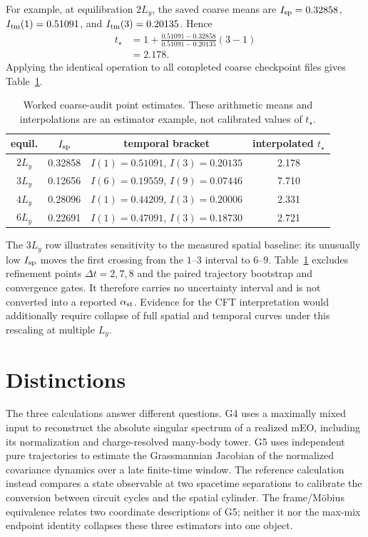 \documentclass[aps,prx,twocolumn,superscriptaddress,longbibliography,nofootinbib,floatfix]{revtex4-2}
\begin{document}
For example, at equilibration $2L_y$, the saved coarse means are
$I_{\rm sp}=0.32858$, $I_{\rm tm}(1)=0.51091$, and
$I_{\rm tm}(3)=0.20135$.  Hence
\begin{align}
 t_\star&=1+\frac{0.51091-0.32858}{0.51091-0.20135}(3-1)\nonumber\\
 &=2.178.
 \label{eq:worked-crossing}
\end{align}
Applying the identical operation to all completed coarse checkpoint files gives
Table~\ref{tab:coarse}.

\begin{table}[t]
\caption{Worked coarse-audit point estimates.  These arithmetic means and interpolations
are an estimator example, not calibrated values of $t_\star$.}
\label{tab:coarse}
\centering
\footnotesize
\setlength{\tabcolsep}{3.2pt}
\begin{tabular}{@{}cccc@{}}
\toprule
equil. & $I_{\rm sp}$ & temporal bracket & interpolated $t_\star$\\
\midrule
$2L_y$ & 0.32858 & $I(1)=0.51091$, $I(3)=0.20135$ & 2.178\\
$3L_y$ & 0.12656 & $I(6)=0.19559$, $I(9)=0.07446$ & 7.710\\
$4L_y$ & 0.28096 & $I(1)=0.44209$, $I(3)=0.20006$ & 2.331\\
$6L_y$ & 0.22691 & $I(1)=0.47091$, $I(3)=0.18730$ & 2.721\\
\bottomrule
\end{tabular}
\end{table}

The $3L_y$ row illustrates sensitivity to the measured spatial baseline: its unusually
low $I_{\rm sp}$ moves the first crossing from the $1$--$3$ interval to $6$--$9$.
Table~\ref{tab:coarse} excludes refinement points $\Delta t=2,7,8$ and the paired
trajectory bootstrap and convergence gates.  It therefore carries no uncertainty
interval and is not converted into a reported $\alpha_{\rm st}$.
Evidence for the CFT interpretation would additionally require collapse of full spatial
and temporal curves under this rescaling at multiple $L_y$.

\section{Distinctions}

The three calculations answer different questions.  G4 uses a maximally mixed input to
reconstruct the absolute singular spectrum of a realized mEO, including its normalization
and charge-resolved many-body tower.  G5 uses independent pure trajectories to estimate
the Grassmannian Jacobian of the normalized covariance dynamics over a late finite-time
window.  The reference calculation instead compares a state observable at two spacetime
separations to calibrate the conversion between circuit cycles and the spatial cylinder.
The frame/M\"obius equivalence relates two coordinate descriptions of G5; neither it nor
the max-mix endpoint identity collapses these three estimators into one object.

\clearpage


\end{document}
